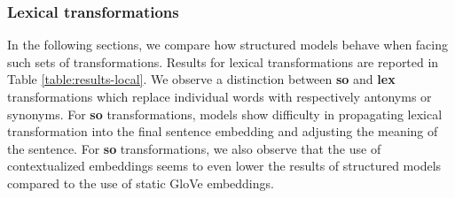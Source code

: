 \subsubsection{Lexical transformations} 


In the following sections, we compare how structured models behave when facing such sets of transformations. Results for lexical transformations are reported in Table \ref{table:results-local}. We observe a distinction between \textbf{so} and \textbf{lex} transformations which replace individual words with respectively antonyms or synonyms. For \textbf{so} transformations, models show difficulty in propagating lexical transformation into the final sentence embedding and adjusting the meaning of the sentence. For \textbf{so} transformations, we also observe that the use of contextualized embeddings seems to even lower the results of structured models compared to the use of static GloVe embeddings.


